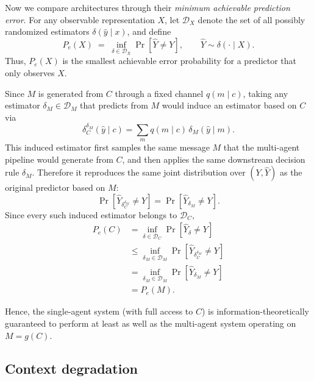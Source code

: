\documentclass{article} %
\begin{document}
Now we compare architectures through their \emph{minimum achievable prediction error}. For any observable representation $X$, let $\mathcal{D}_X$ denote the set of all possibly randomized estimators $\delta(\hat y \mid x)$, and define
\[
P_e(X)
\;=\;
\inf_{\delta \in \mathcal{D}_X}
\Pr[\hat Y \neq Y],
\qquad
\hat Y \sim \delta(\cdot \mid X).
\]
Thus, $P_e(X)$ is the smallest achievable error probability for a predictor that only observes $X$.

Since $M$ is generated from $C$ through a fixed channel $q(m \mid c)$, taking any estimator $\delta_M \in \mathcal{D}_M$ that predicts from $M$ would induce an estimator based on $C$ via
\[
\delta_C^{\delta_M}(\hat y \mid c)
=
\sum_m q(m \mid c)\,\delta_M(\hat y \mid m).
\]
This induced estimator first samples the same message $M$ that the multi-agent pipeline would generate from $C$, and then applies the same downstream decision rule $\delta_M$. Therefore it reproduces the same joint distribution over $(Y,\hat Y)$ as the original predictor based on $M$:
\[
\Pr[\hat Y_{\delta_C^{\delta_M}} \neq Y]
=
\Pr[\hat Y_{\delta_M} \neq Y].
\]
Since every such induced estimator belongs to $\mathcal{D}_C$,
\[
\begin{aligned}
P_e(C)
&=
\inf_{\delta \in \mathcal{D}_C}
\Pr[\hat Y_\delta \neq Y]
\\
&\le
\inf_{\delta_M \in \mathcal{D}_M}
\Pr[\hat Y_{\delta_C^{\delta_M}} \neq Y]
\\
&=
\inf_{\delta_M \in \mathcal{D}_M}
\Pr[\hat Y_{\delta_M} \neq Y]
\\
&=
P_e(M).
\end{aligned}
\]

Hence, the single-agent system (with full access to $C$) is information-theoretically guaranteed to perform at least as well as the multi-agent system operating on $M = g(C)$.

\subsection{Context degradation}
\end{document}

